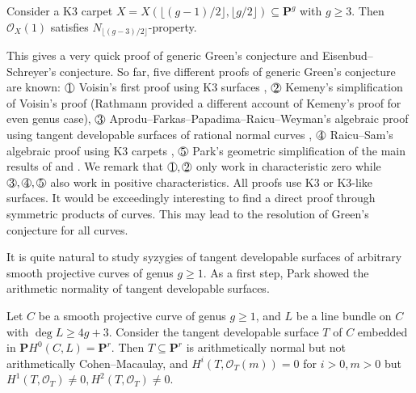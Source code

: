 \documentclass[graybox]{svmult}
\newcommand*\circled[1]{\tikz[baseline=(char.base)]{
            \node[shape=circle,draw,inner sep=0.05pt] (char) {#1};}}
\newcommand{\kk}{\mathbf{k}}
\newcommand{\sO}{\mathscr{O}}
\def\nP{\mathbf{P}}
\begin{document}
\begin{theorem}[{$\operatorname{char}(\kk) = 0$ \normalfont{or} $\geq \lfloor (g-1)/2 \rfloor$ \normalfont{and} $\operatorname{char}(\kk) \neq 2$}]
Consider a K3 carpet $X=X(\lfloor (g-1)/2 \rfloor, \lfloor g/2 \rfloor) \subseteq \nP^g$ with $g \geq 3$. Then $\sO_X(1)$ satisfies $N_{\lfloor (g-3)/2 \rfloor}$-property.
\end{theorem}

This gives a very quick proof of generic Green's conjecture and Eisenbud--Schreyer's conjecture. So far, five different proofs of generic Green's conjecture are known: $\circled{1}$ Voisin's first proof using K3 surfaces \cite{Voisin1, Voisin2}, $\circled{2}$ Kemeny's simplification of Voisin's proof \cite{Kemeny} (Rathmann \cite{Rathmann2} provided a different account of Kemeny’s proof for even genus case), $\circled{3}$ Aprodu--Farkas--Papadima--Raicu--Weyman's algebraic proof using tangent developable surfaces of rational normal curves \cite{AFPRW}, $\circled{4}$ Raicu--Sam's algebraic proof using K3 carpets \cite{RS}, $\circled{5}$ Park's geometric simplification of the main results of \cite{AFPRW} and \cite{RS}. We remark that $\circled{1},\circled{2}$ only work in characteristic zero while $\circled{3}, \circled{4}, \circled{5}$ also work in positive characteristics. All proofs use K3 or K3-like surfaces. It would be exceedingly interesting to find a direct proof through symmetric products of curves. This may lead to the resolution of Green's conjecture for all curves.

It is quite natural to study syzygies of tangent developable surfaces of arbitrary smooth projective curves of genus $g \geq 1$. As a first step, Park \cite[Theorem 1.3]{Park2} showed the arithmetic normality of tangent developable surfaces.

\begin{theorem}[{$\operatorname{char}(\kk)=0$}]\label{thm:arithnormtansurf}
Let $C$ be a smooth projective curve of genus $g \geq 1$, and $L$ be a line bundle on $C$ with $\deg L \geq 4g+3$. Consider the tangent developable surface $T$ of $C$ embedded in $\nP H^0(C, L)=\nP^r$. Then $T \subseteq \nP^r$ is arithmetically normal but not arithmetically Cohen--Macaulay, and $H^i(T, \sO_T(m))=0$ for $i>0, m>0$ but $H^1(T, \sO_T) \neq 0, H^2(T, \sO_T) \neq 0$.
\end{theorem}
\end{document}
